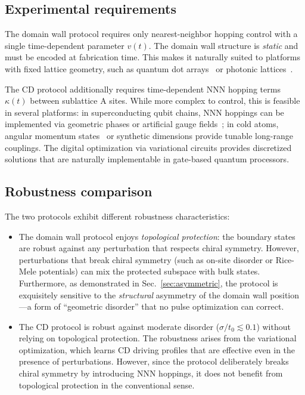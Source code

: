 \documentclass[
  reprint,
  amsmath,
  amssymb,
  aps,
  prb,
  longbibliography,
]{revtex4-2}
\begin{document}
\subsection{Experimental requirements}
\label{sec:comp_experimental}

The domain wall protocol requires only nearest-neighbor hopping control
with a single time-dependent parameter $v(t)$. The domain wall structure
is \emph{static} and must be encoded at fabrication time. This makes it
naturally suited to platforms with fixed lattice geometry, such as quantum
dot arrays~\cite{Mei2018} or photonic lattices~\cite{Meier2016}.

The CD protocol additionally requires time-dependent NNN hopping terms
$\kappa(t)$ between sublattice A sites. While more complex to control,
this is feasible in several platforms: in superconducting qubit chains,
NNN hoppings can be implemented via geometric phases or artificial gauge
fields~\cite{Romero2024}; in cold atoms, angular momentum
states~\cite{Romero2024} or synthetic dimensions provide tunable long-range
couplings. The digital optimization via variational circuits provides
discretized solutions that are naturally implementable in gate-based quantum
processors.

\subsection{Robustness comparison}
\label{sec:comp_robustness}

The two protocols exhibit different robustness characteristics:

\begin{itemize}
  \item The domain wall protocol enjoys \emph{topological protection}: the
    boundary states are robust against any perturbation that respects chiral
    symmetry. However, perturbations that break chiral symmetry (such as
    on-site disorder or Rice-Mele potentials) can mix the protected subspace
    with bulk states. Furthermore, as demonstrated in Sec.~\ref{sec:asymmetric},
    the protocol is exquisitely sensitive to the \emph{structural}
    asymmetry of the domain wall position---a form of ``geometric disorder''
    that no pulse optimization can correct.
  \item The CD protocol is robust against moderate disorder
    ($\sigma/t_0 \lesssim 0.1$) without relying on topological protection.
    The robustness arises from the variational optimization, which learns
    CD driving profiles that are effective even in the presence of perturbations.
    However, since the protocol deliberately breaks chiral symmetry by
    introducing NNN hoppings, it does not benefit from topological protection
    in the conventional sense.
\end{itemize}
\end{document}

